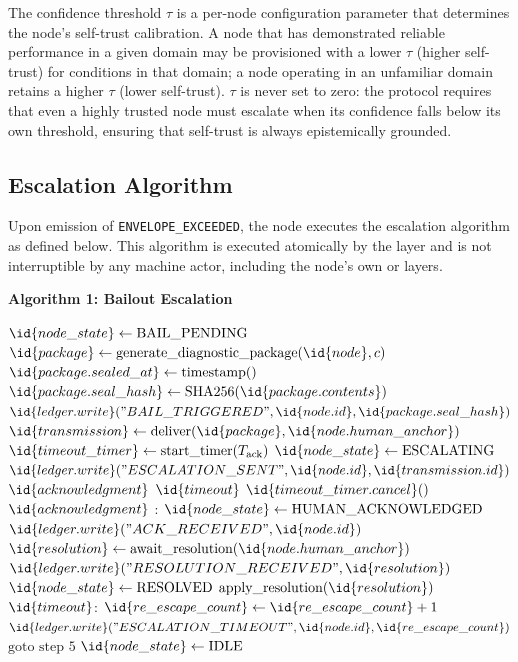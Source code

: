 The confidence threshold $\tau$ is a per-node configuration parameter that determines the node's self-trust calibration. A node that has demonstrated reliable performance in a given domain may be provisioned with a lower $\tau$ (higher self-trust) for conditions in that domain; a node operating in an unfamiliar domain retains a higher $\tau$ (lower self-trust). $\tau$ is never set to zero: the protocol requires that even a highly trusted node must escalate when its confidence falls below its own threshold, ensuring that self-trust is always epistemically grounded.

\subsection{Escalation Algorithm}
\label{sec:escalation-algorithm}

Upon emission of \texttt{ENVELOPE\_EXCEEDED}, the node executes the escalation algorithm as defined below. This algorithm is executed atomically by the \bounds{} layer and is not interruptible by any machine actor, including the node's own \purpose{} or \truth{} layers.

\bigskip
\noindent\textbf{Algorithm 1: Bailout Escalation}
\begin{algorithmic}
\State $\id{node\_state} \gets \text{BAIL\_PENDING}$
\State $\id{package} \gets \text{generate\_diagnostic\_package}(\id{node}, c)$
\State $\id{package.sealed\_at} \gets \text{timestamp}()$
\State $\id{package.seal\_hash} \gets \text{SHA256}(\id{package.contents})$
\State $\id{ledger.write}("BAIL\_TRIGGERED", \id{node.id}, \id{package.seal\_hash})$
\State $\id{transmission} \gets \text{deliver}(\id{package}, \id{node.human\_anchor})$
\State $\id{timeout\_timer} \gets \text{start\_timer}(T_{\text{ack}})$
\State $\id{node\_state} \gets \text{ESCALATING}$
\State $\id{ledger.write}("ESCALATION\_SENT", \id{node.id}, \id{transmission.id})$
\State {} $\id{acknowledgment}$  $\id{timeout}$
\State $\id{timeout\_timer.cancel}()$
\State {} $\id{acknowledgment}$ :
\State \quad $\id{node\_state} \gets \text{HUMAN\_ACKNOWLEDGED}$
\State \quad $\id{ledger.write}("ACK\_RECEIVED", \id{node.id})$
\State \quad $\id{resolution} \gets \text{await\_resolution}(\id{node.human\_anchor})$
\State \quad $\id{ledger.write}("RESOLUTION\_RECEIVED", \id{resolution})$
\State \quad $\id{node\_state} \gets \text{RESOLVED}$
\State \quad $\text{apply\_resolution}(\id{resolution})$
\State {} $\id{timeout}$:
\State \quad $\id{re\_escape\_count} \gets \id{re\_escape\_count} + 1$
\State \quad $\id{ledger.write}("ESCALATION\_TIMEOUT", \id{node.id}, \id{re\_escape\_count})$
\State \quad $\text{goto step 5}$ 
\State $\id{node\_state} \gets \text{IDLE}$
\end{algorithmic}

